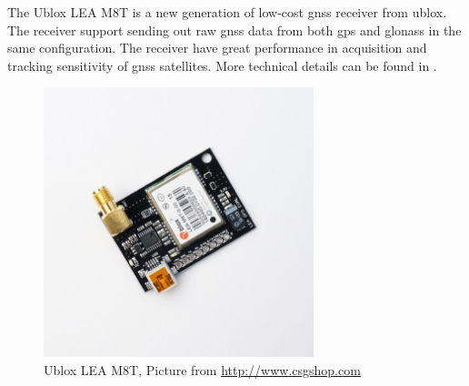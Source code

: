 The Ublox LEA M8T is a new generation of low-cost \gls{gnss} receiver from ublox. The receiver support sending out raw \gls{gnss} data from both \gls{gps} and \gls{glonass} in the same configuration. The receiver have great performance in acquisition and tracking sensitivity of \gls{gnss} satellites. More technical details can be found in  \citep{UbloxDataSheet,UbloxReceiverDescription}.
\begin{figure}[H]
	\centering
		\includegraphics[width=0.7\textwidth]{figs/ubloxLeaM8T.jpg}
		\caption{Ublox LEA M8T, Picture from \url{http://www.csgshop.com}}
		\label{figure:Ublox}
\end{figure}
